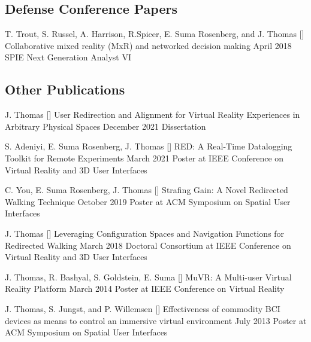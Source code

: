 \begin{cventries}
  \vspace{-.25cm}
  \subsection*{Defense Conference Papers}
  \cventry
    {T. Trout, S. Russel, A. Harrison, R.Spicer, E. Suma Rosenberg, and J. Thomas} %
    {[\thenpubs] Collaborative mixed reality (MxR) and networked decision making} %
    {April 2018} %
    {} %
    {SPIE Next Generation Analyst VI} %
    
  \vspace{-.25cm}    
  \subsection*{Other Publications}
  \cventry
    {J. Thomas} %
    {[\thenpubs] User Redirection and Alignment for Virtual Reality Experiences in Arbitrary Physical Spaces} %
    {December 2021} %
    {} %
    {Dissertation} %
    
  \cventry
    {S. Adeniyi, E. Suma Rosenberg, J. Thomas} %
    {[\thenpubs] RED: A Real-Time Datalogging Toolkit for Remote Experiments} %
    {March 2021} %
    {} %
    {Poster at IEEE Conference on Virtual Reality and 3D User Interfaces} %
    
  \cventry
    {C. You, E. Suma Rosenberg, J. Thomas} %
    {[\thenpubs] Strafing Gain: A Novel Redirected Walking Technique} %
    {October 2019} %
    {} %
    {Poster at ACM Symposium on Spatial User Interfaces} %
  
  \cventry
    {J. Thomas} %
    {[\thenpubs] Leveraging Configuration Spaces and Navigation Functions for Redirected Walking} %
    {March 2018} %
    {} %
    {Doctoral Consortium at IEEE Conference on Virtual Reality and 3D User Interfaces} %
    
  \cventry
    {J. Thomas, R. Bashyal, S. Goldstein, E. Suma} %
    {[\thenpubs] MuVR: A Multi-user Virtual Reality Platform} %
    {March 2014} %
    {} %
    {Poster at IEEE Conference on Virtual Reality} %
    
  \cventry
    {J. Thomas, S. Jungst, and P. Willemsen} %
    {[\thenpubs] Effectiveness of commodity BCI devices as means to control an immersive virtual environment} %
    {July 2013} %
    {} %
    {Poster at ACM Symposium on Spatial User Interfaces} %

\end{cventries}